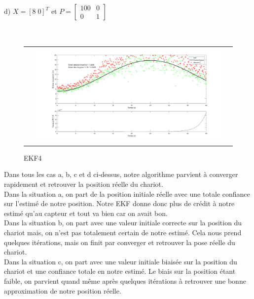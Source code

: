 \documentclass[11pt]{article}		%
\begin{document}
\noindent d) $X = [8\; 0]^T$ et $P = \begin{bmatrix}100 & 0\\0 & 1\end{bmatrix}$ \\ \\ \\

\vspace{-0.3in}
\label{EKF}
\begin{figure}[ht]
 \begin{center}
  \begin{tabular}{c}
    \includegraphics[width=0.95\textwidth]{ekf4.png} 
  \end{tabular}
 \end{center}
 \vspace{-0.3in}
 \caption{EKF4}
 \label{EKF4}
\end{figure}

\noindent Dans tous les cas a, b, c et d ci-dessus, notre algorithme parvient à converger rapidement et retrouver la position réelle du chariot. \\

\noindent Dans la situation a, on part de la position initiale réelle avec une totale confiance sur l'estimé de notre position. Notre EKF donne donc plus de crédit à notre estimé qu'au capteur et tout va bien car on avait bon. \\

\noindent Dans la situation b, on part avec une valeur initiale correcte sur la position du chariot mais, on n'est pas totalement certain de notre estimé. Cela nous prend quelques itérations, mais on finit par converger et retrouver la pose réelle du chariot. \\

\noindent Dans la situation c, on part avec une valeur initiale biaisée sur la position du chariot et une confiance totale en notre estimé. Le biais sur la position étant faible, on parvient quand même après quelques itérations à retrouver une bonne approximation de notre position réelle.  \\
\end{document}
